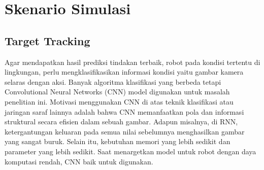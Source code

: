 

	








\section{Skenario Simulasi }
\subsection{Target Tracking}
Agar mendapatkan hasil prediksi tindakan terbaik, robot pada kondisi tertentu di lingkungan, perlu mengklasifikasikan informasi kondisi yaitu gambar kamera selaras dengan aksi. Banyak algoritma klasifikasi yang berbeda tetapi   Convolutional Neural Networks
(CNN) model digunakan untuk masalah penelitian ini.
Motivasi menggunakan CNN di atas teknik klasifikasi atau jaringan saraf lainnya adalah bahwa CNN memanfaatkan pola dan informasi struktural secara efisien dalam sebuah gambar. Adapun misalnya, di RNN, ketergantungan keluaran pada semua nilai sebelumnya menghasilkan gambar yang sangat buruk. Selain itu, kebutuhan memori yang lebih sedikit dan parameter yang lebih sedikit. Saat menargetkan model untuk robot dengan daya komputasi rendah, CNN baik untuk digunakan.


